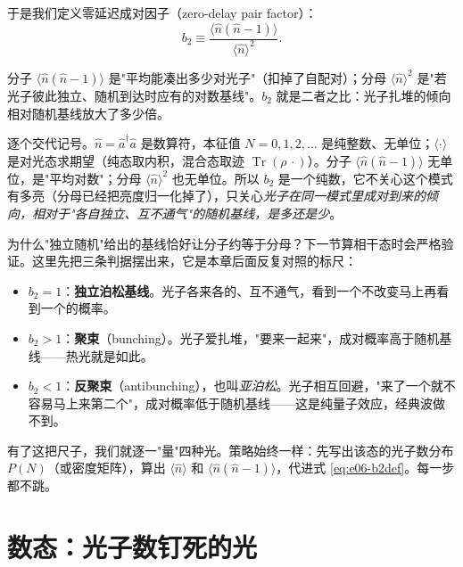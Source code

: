 于是我们定义零延迟成对因子（zero-delay pair factor）：
\begin{equation}
  b_2\equiv\frac{\langle\hat n(\hat n-1)\rangle}{\langle\hat n\rangle^{2}} .
  \label{eq:e06-b2def}
\end{equation}
\begin{formulaexplain}
分子 \(\langle\hat n(\hat n-1)\rangle\) 是"平均能凑出多少对光子"（扣掉了自配对）；分母 \(\langle\hat n\rangle^2\) 是"若光子彼此独立、随机到达时应有的对数基线"。\(b_2\) 就是二者之比：光子扎堆的倾向相对随机基线放大了多少倍。
\end{formulaexplain}

逐个交代记号。\(\hat n=\hat a^\dagger\hat a\) 是数算符，本征值 \(N=0,1,2,\dots\) 是纯整数、无单位；\(\langle\cdot\rangle\) 是对光态求期望（纯态取内积，混合态取迹 \(\operatorname{Tr}(\rho\,\cdot)\)）。分子 \(\langle\hat n(\hat n-1)\rangle\) 无单位，是"平均对数"；分母 \(\langle\hat n\rangle^2\) 也无单位。所以 \(b_2\) 是一个纯数，它不关心这个模式有多亮（分母已经把亮度归一化掉了），只关心\emph{光子在同一模式里成对到来的倾向，相对于"各自独立、互不通气"的随机基线，是多还是少}。

为什么"独立随机"给出的基线恰好让分子约等于分母？下一节算相干态时会严格验证。这里先把三条判据摆出来，它是本章后面反复对照的标尺：
\begin{itemize}
  \item \(b_2=1\)：\textbf{独立泊松基线}。光子各来各的、互不通气，看到一个不改变马上再看到一个的概率。
  \item \(b_2>1\)：\textbf{聚束}（bunching）。光子爱扎堆，"要来一起来"，成对概率高于随机基线——热光就是如此。
  \item \(b_2<1\)：\textbf{反聚束}（antibunching），也叫\emph{亚泊松}。光子相互回避，"来了一个就不容易马上来第二个"，成对概率低于随机基线——这是纯量子效应，经典波做不到。
\end{itemize}

有了这把尺子，我们就逐一"量"四种光。策略始终一样：先写出该态的光子数分布 \(P(N)\)（或密度矩阵），算出 \(\langle\hat n\rangle\) 和 \(\langle\hat n(\hat n-1)\rangle\)，代进式 \eqref{eq:e06-b2def}。每一步都不跳。

\section{数态：光子数钉死的光}
\label{sec:e06-fock}

